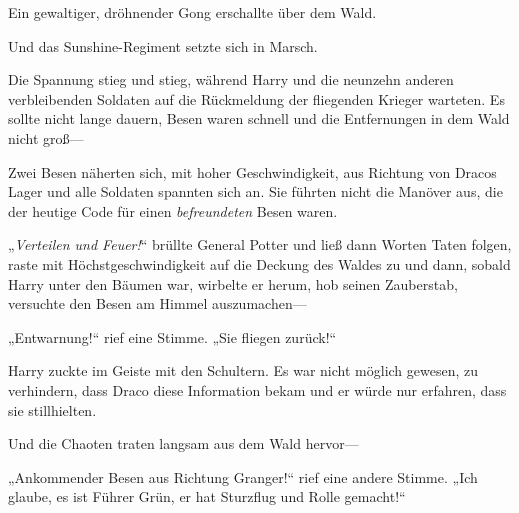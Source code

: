 \later

Ein gewaltiger, dröhnender Gong erschallte über dem Wald.

Und das Sunshine-Regiment setzte sich in Marsch.

\later

Die Spannung stieg und stieg, während Harry und die neunzehn anderen verbleibenden Soldaten auf die Rückmeldung der fliegenden Krieger warteten. Es sollte nicht lange dauern, Besen waren schnell und die Entfernungen in dem Wald nicht groß—

Zwei Besen näherten sich, mit hoher Geschwindigkeit, aus Richtung von Dracos Lager und alle Soldaten spannten sich an. Sie führten nicht die Manöver aus, die der heutige Code für einen \emph{befreundeten} Besen waren.

„\emph{Verteilen und Feuer!}“ brüllte General Potter und ließ dann Worten Taten folgen, raste mit Höchstgeschwindigkeit auf die Deckung des Waldes zu und dann, sobald Harry unter den Bäumen war, wirbelte er herum, hob seinen Zauberstab, versuchte den Besen am Himmel auszumachen—

„Entwarnung!“ rief eine Stimme.
„Sie fliegen zurück!“

Harry zuckte im Geiste mit den Schultern. Es war nicht möglich gewesen, zu verhindern, dass Draco diese Information bekam und er würde nur erfahren, dass sie stillhielten.

Und die Chaoten traten langsam aus dem Wald hervor—

„Ankommender Besen aus Richtung Granger!“ rief eine andere Stimme.
„Ich glaube, es ist Führer Grün, er hat Sturzflug und Rolle gemacht!“

